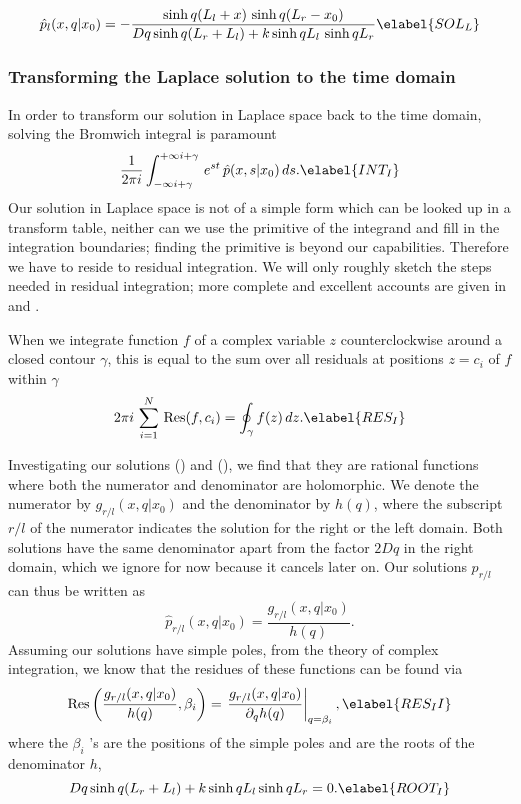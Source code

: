 \begin{equation}
 \hat{p}_l(x,q|x_0) = -\frac{\mathrm{sinh} \, q(L_l + x) \,\, \mathrm{sinh} \, q(L_r - x_0)}{Dq \, \mathrm{sinh} \, q(L_r + L_l) + k \, \mathrm{sinh} \, q L_l \,\, \mathrm{sinh} \, q L_r}
\elabel{SOL_L}
\end{equation}

\subsubsection{Transforming the Laplace solution to the time domain}

In order to transform our solution in Laplace space back to the time domain, solving the Bromwich integral is paramount
\begin{equation}
 \frac{1}{2 \pi i} \int_{-\infty i + \gamma}^{+\infty i + \gamma} \, e^{s t} \, \hat{p}(x,s|x_0) \, ds.
 \elabel{INT_I}
\end{equation}
Our solution in Laplace space is not of a simple form which can be looked up in a transform table, neither can we use the primitive of the integrand and fill in the integration boundaries; finding the primitive is beyond our capabilities. Therefore we have to reside to residual integration. We will only roughly sketch the steps needed in residual integration; more complete and excellent accounts are given in \cite{Carslaw1959} and \cite{Bossen2011a}.

When we integrate function $f$ of a complex variable $z$ counterclockwise around a closed contour $\gamma$, this is equal to the sum over all residuals at positions $z = c_i$ of $f$ within $\gamma$
\begin{equation}
 2 \pi i\,\sum_{i=1}^{N}\,\mathrm{Res}(f,c_i) = \oint_\gamma f(z)\,dz.
 \elabel{RES_I}
\end{equation}

Investigating our solutions () and (), we find that they are rational functions where both the numerator and denominator are holomorphic. We denote the numerator by $g_{r/l}(x,q|x_0)$ and the denominator by $h(q)$, where the subscript $r/l$ of the numerator indicates the solution for the right or the left domain. Both solutions have the same denominator apart from the factor $2 D q$ in the right domain, which we ignore for now because it cancels later on. Our solutions $p_{r/l}$ can thus be written as
\begin{equation} 
 \hat{p}_{r/l}(x,q|x_0) = \frac{g_{r/l}(x,q|x_0)}{h(q)}.
\end{equation}
Assuming our solutions have simple poles, from the theory of complex integration, we know that the residues of these functions can be found via
\begin{equation} 
 \mathrm{Res} \left( \frac{g_{r/l}(x,q|x_0)}{h(q)},\beta_i \right) = \left. \frac{g_{r/l}(x,q|x_0)}{\partial_q h(q)} \right|_{q = \beta_i},
 \elabel{RES_II}
\end{equation}
where the $\beta_i$ 's are the positions of the simple poles and are the roots of the denominator $h$,
\begin{equation} 
 Dq \, \mathrm{sinh} \, q (L_r + L_l) + k \, \mathrm{sinh} \, q L_l \, \mathrm{sinh} \, q L_r = 0.
 \elabel{ROOT_I}
\end{equation}

